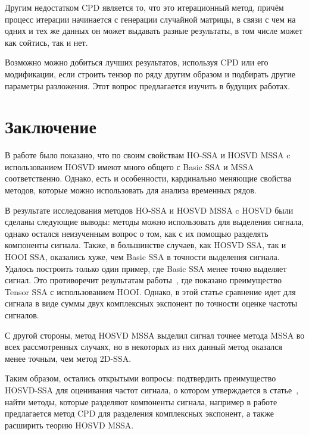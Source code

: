\documentclass[specialist,
    substylefile = spbu_report.rtx,
    subf,href,colorlinks=true, 12pt]{disser}
\theoremstyle{plain}
\theoremstyle{definition}
\theoremstyle{remark}
\begin{document}
    Другим недостатком CPD является то, что это итерационный метод, причём процесс итерации начинается
    с генерации случайной матрицы, в связи с чем на одних и тех же данных он может выдавать разные результаты, в том
    числе может как сойтись, так и нет.

    Возможно можно добиться лучших результатов, используя CPD или его модификации, если строить тензор по ряду другим образом и подбирать
    другие параметры разложения.
    Этот вопрос предлагается изучить в будущих работах.
    \newpage


    \section{Заключение}\label{sec:conclusion}
    В работе было показано, что по своим свойствам HO-SSA и HOSVD MSSA c использованием HOSVD
    имеют много общего с Basic SSA и MSSA соответственно.
    Однако, есть и особенности, кардинально меняющие свойства методов, которые можно использовать для анализа временных рядов.

    В результате исследования методов HO-SSA и HOSVD MSSA c HOSVD были сделаны следующие выводы:
    методы можно использовать для выделения сигнала, однако остался неизученным вопрос о том,
    как с их помощью разделять компоненты сигнала.
    Также, в большинстве случаев, как HOSVD SSA, так и HOOI SSA, оказались хуже,
    чем Basic SSA в точности выделения сигнала.
    Удалось построить только один пример, где Basic SSA менее точно выделяет сигнал.
    Это противоречит результатам работы~\cite{hosvd-hooi-separation}, где показано преимущество Tensor SSA с
    использованием HOOI.
    Однако, в этой статье сравнение идет для сигнала в виде суммы двух комплексных экспонент по точности оценке частоты сигналов.

    С другой стороны, метод HOSVD MSSA выделил сигнал точнее метода MSSA во всех рассмотренных случаях, но в
    некоторых из них данный метод оказался менее точным, чем метод 2D-SSA.

    Таким образом, остались открытыми вопросы: подтвердить преимущество HOSVD-SSA для оценивания
    частот сигнала,
    о котором утверждается в статье~\cite{hosvd-hooi-separation}, найти методы, которые разделяют компоненты сигнала,
    например в работе~\cite{cpd-separation} предлагается метод CPD для разделения комплексных экспонент, а также
    расширить теорию HOSVD MSSA.

    
    
\end{document}
